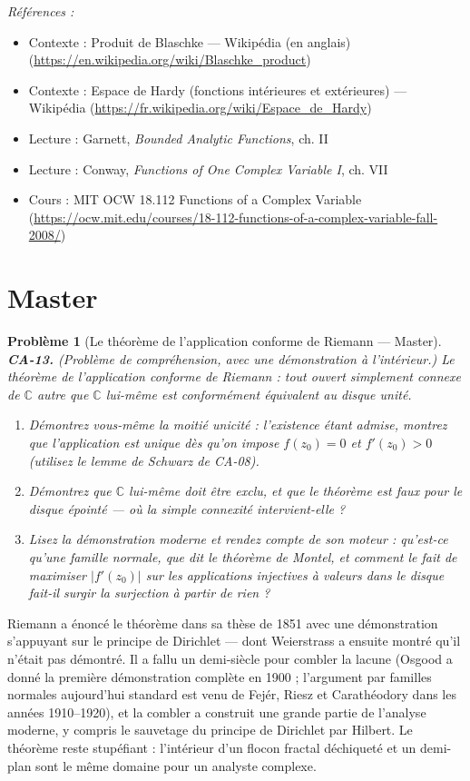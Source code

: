 \documentclass[11pt]{article}
\newtheorem{problem}{Problème}
\newenvironment{refs}{\par\small\noindent\emph{Références :}\begin{itemize}\setlength\itemsep{0pt}}{\end{itemize}\normalsize}
\begin{document}
\begin{refs}
\item Contexte : Produit de Blaschke --- Wikipédia (en anglais) (\url{https://en.wikipedia.org/wiki/Blaschke_product})
\item Contexte : Espace de Hardy (fonctions intérieures et extérieures) --- Wikipédia (\url{https://fr.wikipedia.org/wiki/Espace_de_Hardy})
\item Lecture : Garnett, \textit{Bounded Analytic Functions}, ch. II
\item Lecture : Conway, \textit{Functions of One Complex Variable I}, ch. VII
\item Cours : MIT OCW 18.112 Functions of a Complex Variable (\url{https://ocw.mit.edu/courses/18-112-functions-of-a-complex-variable-fall-2008/})
\end{refs}

\bigskip


\section*{Master}

\begin{problem}[{Le théorème de l'application conforme de Riemann --- Master}]
\textbf{CA-13.} (Problème de compréhension, avec une démonstration à l'intérieur.) Le théorème
de l'application conforme de Riemann : tout ouvert simplement connexe de $ \mathbb{C} $ autre que
$ \mathbb{C} $ lui-même est conformément équivalent au disque unité.
\begin{enumerate}
\item[(a)] Démontrez vous-même la moitié \og{} unicité \fg{} :
l'existence étant admise, montrez que l'application est unique dès qu'on impose
$ f(z_0) = 0 $ et $ f'(z_0) > 0 $ (utilisez le lemme de Schwarz de CA-08).
\item[(b)] Démontrez que
$ \mathbb{C} $ lui-même doit être exclu, et que le théorème est faux pour le disque épointé --- où
la simple connexité intervient-elle ?
\item[(c)] Lisez la démonstration moderne et rendez compte de son
moteur : qu'est-ce qu'une famille normale, que dit le théorème de Montel, et comment le fait de
maximiser $ |f'(z_0)| $ sur les applications injectives à valeurs dans le disque fait-il surgir la
surjection à partir de rien ?
\end{enumerate}

\end{problem}

\noindent Riemann a énoncé le théorème dans sa thèse de 1851 avec une démonstration
s'appuyant sur le principe de Dirichlet --- dont Weierstrass a ensuite montré qu'il n'était pas
démontré. Il a fallu un demi-siècle pour combler la lacune (Osgood a donné la première démonstration
complète en 1900 ; l'argument par familles normales aujourd'hui standard est venu de Fejér, Riesz et
Carathéodory dans les années 1910--1920), et la combler a construit une grande partie de l'analyse
moderne, y compris le sauvetage du principe de Dirichlet par Hilbert. Le théorème reste stupéfiant :
l'intérieur d'un flocon fractal déchiqueté et un demi-plan sont le même domaine pour un analyste
complexe.
\end{document}
